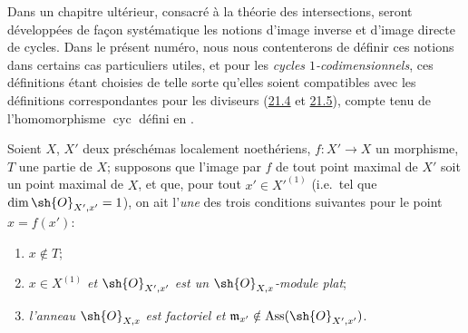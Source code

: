 Dans un chapitre ultérieur, consacré à la théorie des intersections, seront développées de façon systématique les notions d'image inverse et d'image directe de cycles.
Dans le présent numéro, nous nous contenterons de définir ces notions dans certains cas particuliers utiles, et pour les \emph{cycles $1$-codimensionnels}, ces définitions étant choisies de telle sorte qu'elles soient compatibles avec les définitions correspondantes pour les diviseurs (\hyperref[IV.21.4]{21.4} et \hyperref[IV.21.5]{21.5}), compte tenu de l'homomorphisme $\operatorname{cyc}$ défini en .

\begin{env}[21.10.1]
\label{IV.21.10.1}
Soient $X$, $X'$ deux préschémas localement noethériens, $f:X'\to X$ un morphisme, $T$ une partie de $X$;
supposons que l'image par $f$ de tout point maximal de $X'$ soit un point maximal de $X$, et que, pour tout $x'\in X'^{(1)}$ (i.e.\ tel que $\dim\sh{O}_{X',x'}=1$), on ait l'\emph{une} des trois conditions suivantes pour le point $x=f(x')$:
\begin{enumerate}[label=(\roman*)]
  \item $x\notin T$;
  \item $x\in X^{(1)}$ \emph{et} $\sh{O}_{X',x'}$ \emph{est un} $\sh{O}_{X,x}$\emph{-module plat};
  \item \emph{l'anneau} $\sh{O}_{X,x}$ \emph{est factoriel et} $\mathfrak{m}_{x'}\notin\operatorname{Ass}(\sh{O}_{X',x'})$.
\end{enumerate}


\end{env}
